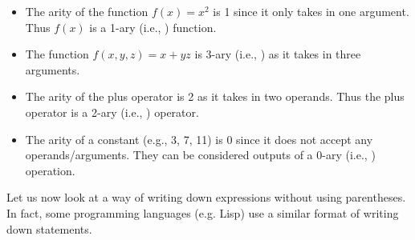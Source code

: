 \begin{example}
    \begin{itemize}[leftmargin=*]
        \item The arity of the function $f(x) = x^2$ is 1 since it only takes in one argument. Thus $f(x)$ is a 1-ary (i.e., ) function.
        \item The function $f(x, y, z) = x+yz$ is 3-ary (i.e., ) as it takes in three arguments.
        \item The arity of the plus operator is 2 as it takes in two operands. Thus the plus operator is a 2-ary (i.e., ) operator.
        \item The arity of a constant (e.g., 3, 7, 11) is 0 since it does not accept any operands/arguments. They can be considered outputs of a 0-ary (i.e., ) operation.
    \end{itemize}
\end{example}

Let us now look at a way of writing down expressions without using parentheses. In fact, some programming languages (e.g. Lisp) use a similar format of writing down statements.

